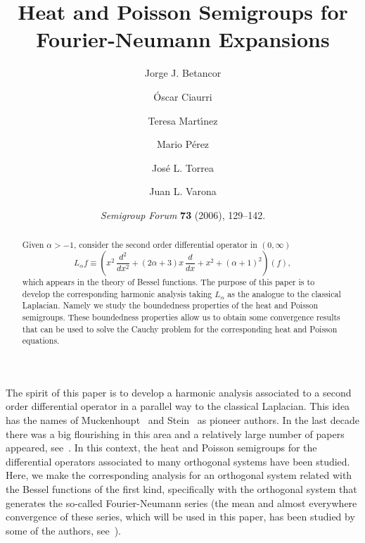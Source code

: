\documentclass[11pt,a4paper]{amsart}
\date{\textit{Semigroup Forum} \textbf{73} (2006), 129--142.}
\author[Betancor]{Jorge J. Betancor}
\author[Ciaurri]{\'Oscar Ciaurri}
\author[Mart\'{\i}nez]{Teresa Mart\'{\i}nez}
\author[P\'erez]{Mario P\'erez}
\author[Torrea]{Jos\'e L. Torrea}
\author[Varona]{Juan L. Varona}
\theoremstyle{plain}
\theoremstyle{remark}
\begin{document}

\title{Heat and Poisson Semigroups for Fourier-Neumann Expansions}

\begin{abstract}
Given $\alpha > -1$, consider the second order differential
operator in $(0,\infty)$
\[
  L_\alpha f \equiv \left(x^2\, \frac{d^2}{dx^2}
    + (2\alpha+3)x\, \frac{d}{dx} + x^2 + (\alpha+1)^2 \right)(f),
\]
which appears in the theory of Bessel functions. The purpose of this paper
is to develop the corresponding harmonic analysis taking $L_\alpha$ as
the analogue to the classical Laplacian. Namely we study the boundedness
properties of the heat and Poisson semigroups. These boundedness properties
allow us to obtain some convergence results that can be used to solve the Cauchy
problem for the corresponding heat and Poisson equations.
\end{abstract}

\maketitle

The spirit of this paper is to develop a harmonic analysis associated to a second order differential operator in a parallel way to the classical Laplacian. This idea has the names of Muckenhoupt~\cite{Mu} and Stein~\cite{Stein-2} as pioneer authors. In the last decade there was a big flourishing in this area and a relatively large number of papers appeared, see~\cite{MST, BMTU}. In this context, the heat and Poisson semigroups for the differential operators associated to many orthogonal systems have been studied. Here, we make the corresponding analysis for an orthogonal system related with the Bessel functions of the first kind, specifically with the orthogonal system that generates the so-called Fourier-Neumann series (the mean and almost everywhere convergence of these series, which will be used in this paper, has been studied by some of the  authors, see~\cite{CiGPV,V}).
\end{document}
